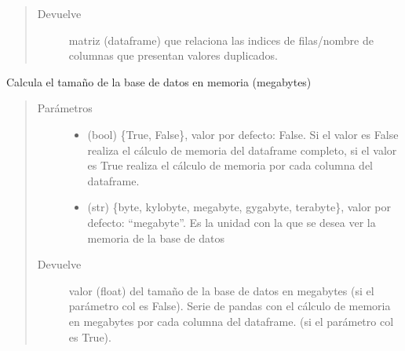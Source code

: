 \documentclass[letterpaper,10pt,openany,spanish]{sphinxmanual}
\begin{document}
\begin{fulllineitems}
\begin{fulllineitems}
\begin{quote}
\begin{description}
\item[{Devuelve}] \leavevmode
matriz (dataframe) que relaciona las indices de filas/nombre             de columnas que presentan valores duplicados.

\end{description}\end{quote}

\end{fulllineitems}


\begin{fulllineitems}
\label{\detokenize{calidad_datos:calidad_datos.CalidadDatos.Memoria}}
Calcula el tamaño de la base de datos en memoria (megabytes)
\begin{quote}\begin{description}
\item[{Parámetros}] \leavevmode\begin{itemize}
\item {} 
 \textendash{} (bool) \{True, False\}, valor por defecto: False. Si el             valor es False realiza el cálculo de memoria del dataframe             completo, si el valor es True realiza el cálculo de memoria por             cada columna del dataframe.

\item {} 
 \textendash{} (str) \{byte, kylobyte, megabyte, gygabyte, terabyte\},             valor por defecto: “megabyte”. Es la unidad con la que se desea             ver la memoria de la base de datos

\end{itemize}

\item[{Devuelve}] \leavevmode
valor (float) del tamaño de la base de datos en megabytes             (si el parámetro col es False). Serie de pandas con el cálculo de             memoria en megabytes por cada columna del dataframe. (si el             parámetro col es True).

\end{description}\end{quote}


\end{fulllineitems}
\end{fulllineitems}
\end{document}

